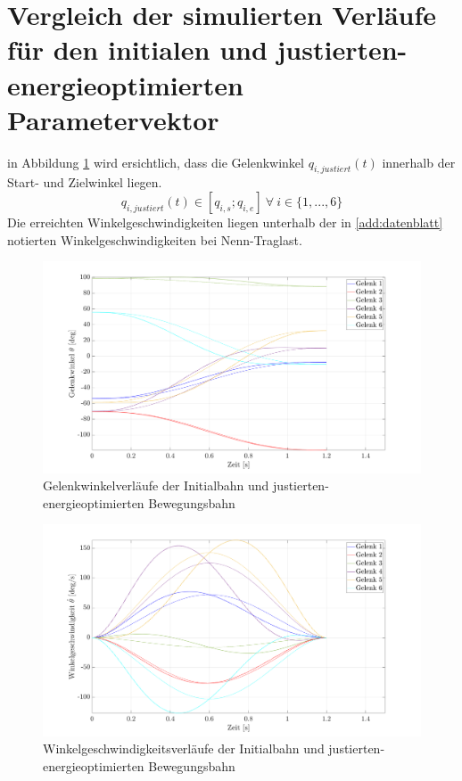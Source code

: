 \section{Vergleich der simulierten Verläufe für den initialen und justierten-energieoptimierten Parametervektor}
\label{add:optupjust}
%
in Abbildung \ref{fig:posoptfinal} wird ersichtlich, dass die Gelenkwinkel $q_{i,justiert}(t)$ innerhalb der Start- und Zielwinkel liegen.
%
\begin{equation}
	q_{i,justiert}(t) \in [q_{i,s};q_{i,e}] ~\forall~ i \in \{1,...,6\}
\end{equation}
%
Die erreichten Winkelgeschwindigkeiten liegen unterhalb der in \ref{add:datenblatt} notierten Winkelgeschwindigkeiten bei Nenn-Traglast.
%
\begin{figure}[tbph]
	\centering
	\includegraphics[width=1\linewidth]{images/Optimierungsergebnisse_up/posoptfinal}
	\caption{Gelenkwinkelverläufe der Initialbahn und justierten-energieoptimierten Bewegungsbahn}
	\label{fig:posoptfinal}
\end{figure}
%
\begin{figure}[tbph]
	\centering
	\includegraphics[width=1\linewidth]{images/Optimierungsergebnisse_up/veloptfinal}
	\caption{Winkelgeschwindigkeitsverläufe der Initialbahn und justierten-energieoptimierten Bewegungsbahn}
	\label{fig:veloptfinal}
\end{figure}
